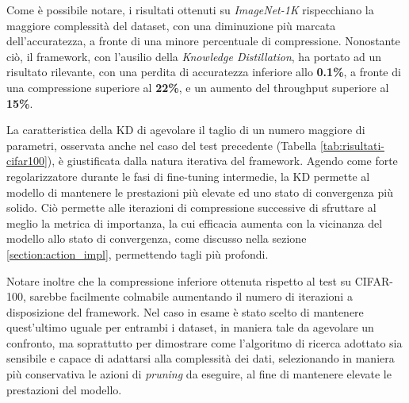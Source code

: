Come è possibile notare, i risultati ottenuti su \textit{ImageNet-1K} rispecchiano la maggiore complessità del dataset, con una diminuzione più marcata dell'accuratezza, a fronte di una minore percentuale di compressione. Nonostante ciò, il framework, con l'ausilio della \textit{Knowledge Distillation}, ha portato ad un risultato rilevante, con una perdita di accuratezza inferiore allo \textbf{0.1\%}, a fronte di una compressione superiore al \textbf{22\%}, e un aumento del throughput superiore al \textbf{15\%}. \par
La caratteristica della KD di agevolare il taglio di un
numero maggiore di parametri, osservata anche nel caso del test precedente (Tabella \ref{tab:risultati-cifar100}), è giustificata dalla natura iterativa del
framework. Agendo come forte regolarizzatore durante le fasi di fine-tuning
intermedie, la KD permette al modello di mantenere le prestazioni più elevate
ed uno stato di convergenza più solido. Ciò permette alle iterazioni di compressione successive di sfruttare al meglio la metrica di importanza, la cui
efficacia aumenta con la vicinanza del modello allo stato di convergenza, come
discusso nella sezione \ref{section:action_impl}, permettendo tagli più
profondi. \par
Notare inoltre che la compressione inferiore ottenuta rispetto al test su
CIFAR-100, sarebbe facilmente colmabile aumentando il numero di iterazioni a
disposizione del framework. Nel caso in esame è stato scelto di mantenere
quest'ultimo uguale per entrambi i dataset, in maniera tale da agevolare un
confronto, ma soprattutto per dimostrare come l'algoritmo di ricerca adottato
sia sensibile e capace di adattarsi alla complessità dei dati, selezionando in
maniera più conservativa le azioni di \textit{pruning} da eseguire, al fine di
mantenere elevate le prestazioni del modello.

